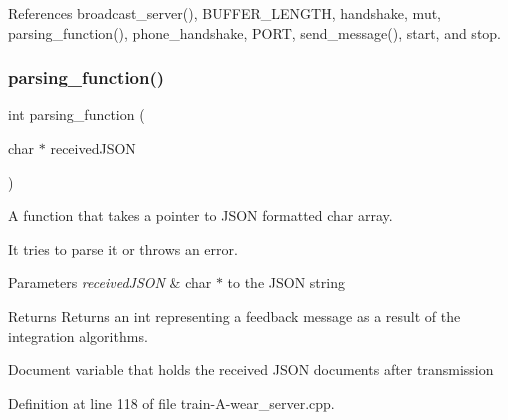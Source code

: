 References broadcast\+\_\+server(), B\+U\+F\+F\+E\+R\+\_\+\+L\+E\+N\+G\+TH, handshake, mut, parsing\+\_\+function(), phone\+\_\+handshake, P\+O\+RT, send\+\_\+message(), start, and stop.

\mbox{\label{train-_a-wear__server_8cpp_acdb6c6606c64b3a5b7b952f030fb5b4e}} 
\subsubsection{\texorpdfstring{parsing\_function()}{parsing\_function()}}
{\footnotesize\ttfamily int parsing\+\_\+function (\begin{DoxyParamCaption}\item[{char $\ast$}]{received\+J\+S\+ON }\end{DoxyParamCaption})}



A function that takes a pointer to J\+S\+ON formatted char array. 

It tries to parse it or throws an error.


\begin{DoxyParams}{Parameters}
{\em received\+J\+S\+ON} & char $\ast$ to the J\+S\+ON string \\
\hline
\end{DoxyParams}
\begin{DoxyReturn}{Returns}
Returns an int representing a feedback message as a result of the integration algorithms. 
\end{DoxyReturn}
Document variable that holds the received J\+S\+ON documents after transmission 

Definition at line 118 of file train-\/\+A-\/wear\+\_\+server.\+cpp.


